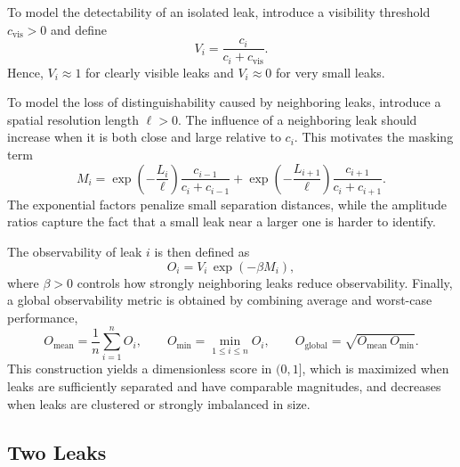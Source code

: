 To model the detectability of an isolated leak, introduce a visibility threshold $c_{\mathrm{vis}}>0$ and define
\[
V_i=\frac{c_i}{c_i+c_{\mathrm{vis}}}.
\]
Hence, $V_i\approx 1$ for clearly visible leaks and $V_i\approx 0$ for very small leaks.

To model the loss of distinguishability caused by neighboring leaks, introduce a spatial resolution length $\ell>0$. The influence of a neighboring leak should increase when it is both close and large relative to $c_i$. This motivates the masking term
\[
M_i=
\exp\!\left(-\frac{L_i}{\ell}\right)\frac{c_{i-1}}{c_i+c_{i-1}}
+
\exp\!\left(-\frac{L_{i+1}}{\ell}\right)\frac{c_{i+1}}{c_i+c_{i+1}}.
\]
The exponential factors penalize small separation distances, while the amplitude ratios capture the fact that a small leak near a larger one is harder to identify.

The observability of leak $i$ is then defined as
\[
O_i = V_i\,\exp(-\beta M_i),
\]
where $\beta>0$ controls how strongly neighboring leaks reduce observability. Finally, a global observability metric is obtained by combining average and worst-case performance,
\[
O_{\mathrm{mean}}=\frac{1}{n}\sum_{i=1}^n O_i,\qquad
O_{\min}=\min_{1\le i\le n} O_i,\qquad
O_{\mathrm{global}}=\sqrt{O_{\mathrm{mean}}\,O_{\min}}.
\]
This construction yields a dimensionless score in $(0,1]$, which is maximized when leaks are sufficiently separated and have comparable magnitudes, and decreases when leaks are clustered or strongly imbalanced in size.





\subsection{Two Leaks}

